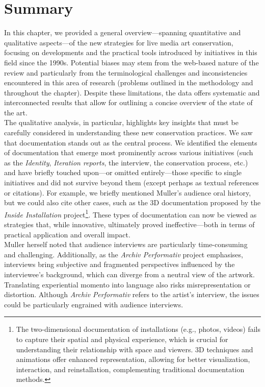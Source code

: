 \section{Summary}
In this chapter, we provided a general overview—spanning quantitative and qualitative aspects—of the new strategies for live media art conservation, focusing on developments and the practical tools introduced by initiatives in this field since the 1990s. Potential biases may stem from the web-based nature of the review and particularly from the terminological challenges and inconsistencies encountered in this area of research (problems outlined in the methodology and throughout the chapter). Despite these limitations, the data offers systematic and interconnected results that allow for outlining a concise overview of the state of the art.\\
The qualitative analysis, in particular, highlights key insights that must be carefully considered in understanding these new conservation practices. We saw that documentation stands out as the central process. We identified the elements of documentation that emerge most prominently across various initiatives (such as the \textit{Identity}, \textit{Iteration reports}, the interview, the conservation process, etc.) and have briefly touched upon—or omitted entirely—those specific to single initiatives and did not survive beyond them (except perhaps as textual references or citations). For example, we briefly mentioned Muller’s audience oral history, but we could also cite other cases, such as the 3D documentation proposed by the \textit{Inside Installation} project\footnote{The two-dimensional documentation of installations (e.g., photos, videos) fails to capture their spatial and physical experience, which is crucial for understanding their relationship with space and viewers. 3D techniques and animations offer enhanced representation, allowing for better visualization, interaction, and reinstallation, complementing traditional documentation methods.}. These types of documentation can now be viewed as strategies that, while innovative, ultimately proved ineffective—both in terms of practical application and overall impact.\\
Muller herself noted that audience interviews are particularly time-consuming and challenging. Additionally, as the \textit{Archiv Performativ} project emphasises, interviews bring subjective and fragmented perspectives influenced by the interviewee’s background, which can diverge from a neutral view of the artwork. Translating experiential momento into language also risks misrepresentation or distortion. Although \textit{Archiv Performativ} refers to the artist’s interview, the issues could be particularly engrained with audience interviews.\\
